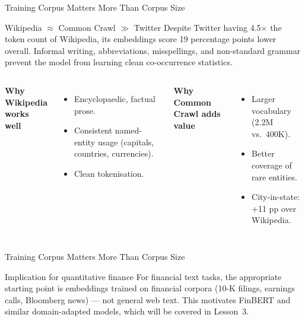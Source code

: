 \documentclass[11pt,aspectratio=169,professionalfonts]{beamer}
\begin{document}
\begin{frame}{Training Corpus Matters More Than Corpus Size}

\begin{block}{Wikipedia $\approx$ Common Crawl $\gg$ Twitter}
  Despite Twitter having 4.5$\times$ the token count of Wikipedia, its
  embeddings score 19 percentage points lower overall. Informal writing,
  abbreviations, misspellings, and non-standard grammar prevent the model
  from learning clean co-occurrence statistics.
\end{block}

\medskip

\begin{columns}[T]
\textbf{Why Wikipedia works well}
\begin{itemize}
  \item Encyclopaedic, factual prose.
  \item Consistent named-entity usage
        (capitals, countries, currencies).
  \item Clean tokenisation.
\end{itemize}

\textbf{Why Common Crawl adds value}
\begin{itemize}
  \item Larger vocabulary (2.2M vs.\ 400K).
  \item Better coverage of rare entities.
  \item City-in-state: +11 pp over Wikipedia.
\end{itemize}
\end{columns}
\end{frame}
%
%
\begin{frame}{Training Corpus Matters More Than Corpus Size}
\medskip
\begin{block}{Implication for quantitative finance}
  For financial text tasks, the appropriate starting point is embeddings
  trained on financial corpora (10-K filings, earnings calls, Bloomberg
  news) — not general web text. This motivates FinBERT and similar
  domain-adapted models, which will be covered in Lesson~3.
\end{block}

\end{frame}
%
%
\end{document}
